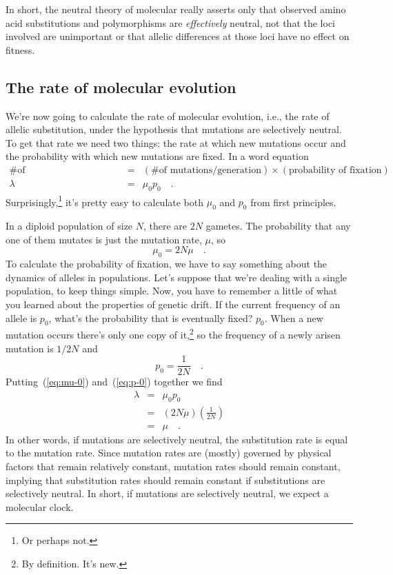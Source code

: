 \noindent In short, the neutral theory of molecular really asserts
only that observed amino acid substitutions and polymorphisms are {\it
effectively\/} neutral, not that the loci involved are unimportant or
that allelic differences at those loci have no effect on
fitness.

\subsection*{The rate of molecular evolution}

We're now going to calculate the rate of molecular evolution, i.e.,
the rate of allelic substitution, under the hypothesis that mutations
are selectively neutral. To get that rate we need two things: the rate
at which new mutations occur and the probability with which new
mutations are fixed. In a word equation
\begin{eqnarray*}
\mbox{\# of substitutions/generation} &=& (\mbox{\# of mutations/generation})\times(\mbox{probability
  of fixation}) \\
\lambda &=& \mu_0p_0 \quad .
\end{eqnarray*}
Surprisingly,\footnote{Or perhaps not.} it's pretty easy to calculate
both $\mu_0$ and $p_0$ from first principles.

In a diploid population of size $N$, there are $2N$ gametes. The
probability that any one of them mutates is just the mutation rate,
$\mu$, so
\begin{equation}
\mu_0 = 2N\mu \quad . \label{eq:mu-0}
\end{equation}
To calculate the probability of fixation, we have to say something
about the dynamics of alleles in populations. Let's suppose that we're
dealing with a single population, to keep things simple. Now, you have
to remember a little of what you learned about the properties of
genetic drift. If the current frequency of an allele is $p_0$, what's
the probability that is eventually fixed?  $p_0$. When a new mutation
occurs there's only one copy of it,\footnote{By definition. It's new.}
so the frequency of a newly arisen mutation is $1/2N$ and
\begin{equation}
p_0 = \frac{1}{2N} \quad . \label{eq:p-0}
\end{equation}
Putting~(\ref{eq:mu-0}) and~(\ref{eq:p-0}) together we find
\begin{eqnarray*}
\lambda &=& \mu_0p_0 \\
        &=& (2N\mu)\left(\frac{1}{2N}\right) \\
        &=& \mu \quad .
\end{eqnarray*}
In other words, if mutations are selectively neutral, the substitution
rate is equal to the mutation rate. Since mutation rates are (mostly)
governed by physical factors that remain relatively constant, mutation
rates should remain constant, implying that substitution rates should
remain constant if substitutions are selectively neutral. In short, if
mutations are selectively neutral, we expect a molecular clock.

